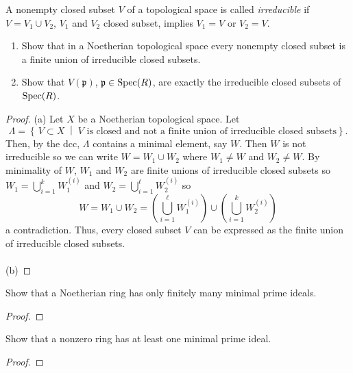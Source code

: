 \newpage
\begin{problem}
A nonempty closed subset $V$ of a topological space is called
\emph{irreducible} if $V=V_1\cup V_2$, $V_1$ and $V_2$ closed
subset, implies $V_1=V$ or $V_2=V$.
\begin{enumerate}[noitemsep,label=(\alph*)]
\item Show that in a Noetherian topological space every nonempty
  closed subset is a finite union of irreducible closed subsets.
\item Show that $V(\mathfrak{p})$, $\mathfrak{p}\in\operatorname{Spec}(R)$, are
  exactly the irreducible closed subsets of $\operatorname{Spec}(R)$.
\end{enumerate}
\end{problem}
\begin{proof}
(a) Let $X$ be a Noetherian topological space. Let
\[
\Lambda=\left\{ \,V\subset X\;\middle|\;\text{$V$ is closed and not a
    finite union of irreducible closed subsets} \right\}.
\]
Then, by the dcc, $\Lambda$ contains a minimal element, say $W$. Then
$W$ is not irreducible so we can write $W=W_1\cup W_2$ where $W_1\neq
W$ and $W_2\neq W$. By minimality of $W$, $W_1$ and $W_2$ are finite
unions of irreducible closed subsets so $W_1=\bigcup_{i=1}^k
W_1^{(i)}$ and $W_2=\bigcup_{i=1}^\ell W_2^{(i)}$ so
\[
W=W_1\cup W_2=\left( \bigcup_{i=1}^\ell W_1^{(i)} \right)\cup\left(
  \bigcup_{i=1}^k W_2^{(i)} \right)
\]
a contradiction. Thus, every closed subset $V$ can be expressed as the
finite union of irreducible closed subsets.
\\\\
(b)
\end{proof}
\newpage
\begin{problem}
Show that a Noetherian ring has only finitely many minimal prime
ideals.
\end{problem}
\begin{proof}
\end{proof}
\newpage
\begin{problem}
Show that a nonzero ring has at least one minimal prime ideal.
\end{problem}
\begin{proof}
\end{proof}

